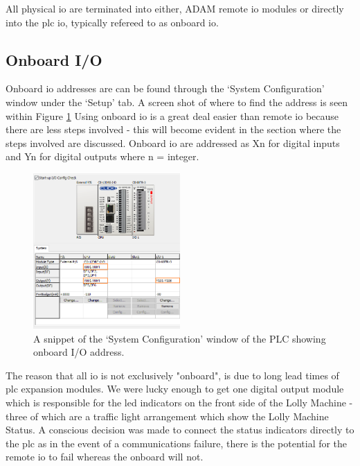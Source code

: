     All physical \acrshort{io} are terminated into either,  ADAM remote \acrshort{io} modules or directly into the \acrshort{plc} \acrshort{io}, typically refereed to as onboard \acrshort{io}.



    \subsection{Onboard I/O}
        Onboard \acrshort{io} addresses are can be found through the `System Configuration' window under the `Setup' tab. A screen shot of where to find the address is seen within Figure \ref{fig:plcConfig}
        Using onboard \acrshort{io} is a great deal easier than remote \acrshort{io} because there are less steps involved - this will become evident in the section where the steps involved are discussed. Onboard \acrshort{io} are addressed as Xn for digital inputs and Yn for digital outputs where n = integer. 
        
        \begin{figure}[H]
            \centering
            \includegraphics[width = 0.5\textwidth]{2_images/plcConfig.png}
            \caption{A snippet of the `System Configuration' window of the PLC showing onboard I/O address.}
            \label{fig:plcConfig}
        \end{figure}
        
        The reason that all \acrshort{io} is not exclusively "onboard", is due to long lead times of \acrshort{plc} expansion modules. We were lucky enough to get one digital output module which is responsible for the \acrshort{led} indicators on the front side of the Lolly Machine - three of which are a traffic light arrangement which show the Lolly Machine Status. A conscious decision was made to connect the status indicators directly to the \acrshort{plc} as in the event of a communications failure, there is the potential for the remote \acrshort{io} to fail whereas the onboard will not. 

